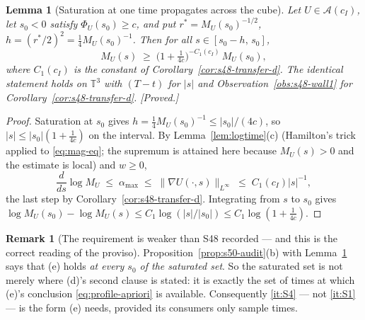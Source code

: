 \documentclass[11pt]{article}
\newtheorem{lemma}[theorem]{Lemma}
\theoremstyle{definition}
\newtheorem{remark}[theorem]{Remark}
\theoremstyle{remark}
\newcommand{\T}{\mathbb{T}}
\begin{document}
\begin{lemma}[Saturation at one time propagates across the cube]
  \label{lem:s50-comparability}
  Let $U\in\mathcal{A}(c_I)$, let $s_0<0$ satisfy $\Phi_U(s_0)\geq c$, and put
  $r^*=M_U(s_0)^{-1/2}$, $h=(r^*/2)^2=\tfrac14M_U(s_0)^{-1}$. Then for all
  $s\in[s_0-h,\,s_0]$,
  \[
    M_U(s) \;\geq\; \bigl(1+\tfrac1{4c}\bigr)^{-C_1(c_I)}\,M_U(s_0),
  \]
  where $C_1(c_I)$ is the constant of Corollary~\ref{cor:s48-transfer-d}.
  The identical statement holds on $\T^3$ with $(T-t)$ for $|s|$ and
  Observation~\ref{obs:s48-wall1} for Corollary~\ref{cor:s48-transfer-d}.
  \emph{[Proved.]}
\end{lemma}
\begin{proof}
  Saturation at $s_0$ gives $h=\tfrac14M_U(s_0)^{-1}\leq|s_0|/(4c)$, so
  $|s|\leq|s_0|(1+\tfrac1{4c})$ on the interval. By
  Lemma~\ref{lem:logtime}(c) (Hamilton's trick applied to
  \eqref{eq:mag-eq}; the supremum is attained here because
  $M_U(s)>0$ and the estimate is local) and $w\geq0$,
  \[
    \frac{d}{ds}\log M_U \;\leq\; \alpha_{\max} \;\leq\;
      \|\nabla U(\cdot,s)\|_{L^\infty} \;\leq\; C_1(c_I)|s|^{-1},
  \]
  the last step by Corollary~\ref{cor:s48-transfer-d}. Integrating from $s$ to
  $s_0$ gives
  $\log M_U(s_0)-\log M_U(s)\leq C_1\log(|s|/|s_0|)
  \leq C_1\log(1+\tfrac1{4c})$.
\end{proof}

\begin{remark}[The requirement is weaker than S48 recorded --- and this is the
  correct reading of the proviso]\label{rem:s50-weaker-requirement}
  Proposition~\ref{prop:s50-audit}(b) with Lemma~\ref{lem:s50-comparability}
  says that (e) holds \emph{at every $s_0$ of the saturated set}. So the
  saturated set is not merely where (d)'s second clause is stated: it is
  exactly the set of times at which (e)'s conclusion
  \eqref{eq:profile-apriori} is available. Consequently \ref{it:S4} --- not
  \ref{it:S1} --- is the form (e) needs, provided its consumers only sample
  times.
\end{remark}
\end{document}
